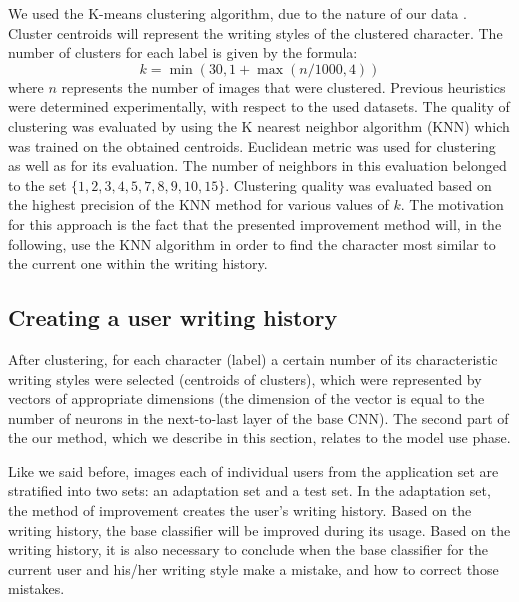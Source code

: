 \documentclass{article}
\begin{document}
We used the K-means clustering algorithm, due to the nature of our data \citep{kmeans}.
Cluster centroids will represent the writing styles of the clustered character.
The number of clusters for each label is given by the formula:
\begin{equation}
  k = \min(30, 1+\max(n/1000, 4))
\end{equation}
where $n$ represents the number of images that were clustered.
Previous heuristics were determined experimentally, with respect to the used datasets.
The quality of clustering was evaluated by using the K nearest neighbor algorithm (KNN) which was trained on the obtained centroids.
Euclidean metric was used for clustering as well as for its evaluation.
The number of neighbors in this evaluation belonged to the set $\{1,2,3,4,5,7,8,9,10,15\}$.
Clustering quality was evaluated based on the highest precision of the KNN method for various values of $k$.
The motivation for this approach is the fact that the presented improvement method will, in the following, use the KNN algorithm in order to find the character most similar to the current one within the writing history.

\subsection{Creating a user writing history}

After clustering, for each character (label) a certain number of its characteristic writing styles were selected (centroids of clusters), which were represented by vectors of appropriate dimensions
(the dimension of the vector is equal to the number of neurons in the next-to-last layer of the base CNN).
The second part of the our method, which we describe in this section, relates to the model use phase.

Like we said before, images each of individual users from the application set are stratified into two sets: an adaptation set and a test set. 
In the adaptation set, the method of improvement creates the user's writing history. 
Based on the writing history, the base classifier will be improved during its usage. 
Based on the writing history, it is also necessary to conclude when the base classifier for the current user and his/her writing style make a mistake, and how to correct those mistakes.
\end{document}
